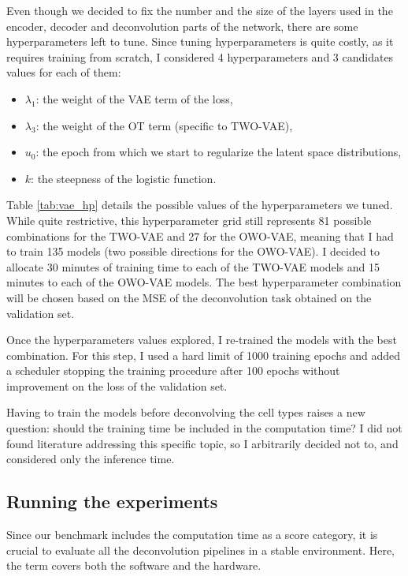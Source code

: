 \documentclass{article}
\begin{document}
Even though we decided to fix the number and the size of the layers used in the encoder, decoder and deconvolution parts of the network, there are some hyperparameters left to tune.
Since tuning hyperparameters is quite costly, as it requires training from scratch, I  considered 4 hyperparameters and 3 candidates values for each of them:
\begin{itemize}
    \item $\lambda_1$: the weight of the VAE term of the loss,
    \item $\lambda_3$: the weight of the OT term (specific to TWO-VAE),
    \item $u_0$: the epoch from which we start to regularize the latent space distributions,
    \item $k$: the steepness of the logistic function.
\end{itemize}
Table \ref{tab:vae_hp} details the possible values of the hyperparameters we tuned.
While quite restrictive, this hyperparameter grid still represents 81 possible combinations for the TWO-VAE and 27 for the OWO-VAE, meaning that I had to train 135 models (two possible directions for the OWO-VAE).
I decided to allocate 30 minutes of training time to each of the TWO-VAE models and 15 minutes to each of the OWO-VAE models. The best hyperparameter combination will be chosen based on the MSE of the deconvolution task obtained on the validation set.



Once the hyperparameters values explored, I re-trained the models with the best combination.
For this step, I used a hard limit of 1000 training epochs and added a scheduler stopping the training procedure after 100 epochs without improvement on the loss of the validation set.

Having to train the models before deconvolving the cell types raises a new question: should the training time be included in the computation time?
I did not found literature addressing this specific topic, so I arbitrarily decided not to, and considered only the inference time.

\subsection{Running the experiments}\label{subsec:running-experiments}

Since our benchmark includes the computation time as a score category, it is crucial to evaluate all the deconvolution pipelines in a stable environment.
Here, the term  covers both the software and the hardware.
\end{document}
